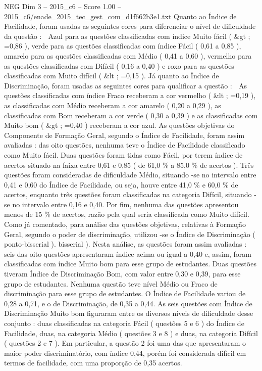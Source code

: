 \begin{textsample}{NEG Dim 3 – 2015\_c6 – Score 1.00 – 2015\_c6/enade\_2015\_tec\_gest\_com\_d1f662b3e1.txt}
Quanto ao Índice de Facilidade, foram usadas as seguintes cores para diferenciar o nível de dificuldade da questão :  Azul para as questões classificadas com índice Muito fácil ( \&gt ; =0,86 ), verde para as questões classificadas com índice Fácil ( 0,61 a 0,85 ), amarelo para as questões classificadas com Médio ( 0,41 a 0,60 ), vermelho para as questões classificadas com Difícil ( 0,16 a 0,40 ) e roxo para as questões classificadas com Muito difícil ( \&lt ; =0,15 ).
Já quanto ao Índice de Discriminação, foram usadas as seguintes cores para qualificar a questão :  As questões classificadas com índice Fraco receberam a cor vermelho ( \&lt ; =0,19 ), as classificadas com Médio receberam a cor amarelo ( 0,20 a 0,29 ), as classificadas com Bom receberam a cor verde ( 0,30 a 0,39 ) e as classificadas com Muito bom ( \&gt ; =0,40 ) receberam a cor azul.
As questões objetivas do Componente de Formação Geral, segundo o Índice de Facilidade, foram assim avaliadas : das oito questões, nenhuma teve o Índice de Facilidade classificado como Muito fácil.
Duas questões foram tidas como Fácil, por terem índice de acertos situado na faixa entre 0,61 e 0,85 ( de 61,0 \% a 85,0 \% de acertos ).
Três questões foram consideradas de dificuldade Médio, situando -se no intervalo entre 0,41 e 0,60 do Índice de Facilidade, ou seja, houve entre 41,0 \% e 60,0 \% de acertos, enquanto três questões foram classificadas na categoria Difícil, situando -se no intervalo entre 0,16 e 0,40.
Por fim, nenhuma das questões apresentou menos de 15 \% de acertos, razão pela qual seria classificada como Muito difícil.
Como já comentado, para análise das questões objetivas, relativas à Formação Geral, segundo o poder de discriminação, utilizou -se o Índice de Discriminação ( ponto-bisserial ). bisserial ).
Nesta análise, as questões foram assim avaliadas : seis das oito questões apresentaram índice acima ou igual a 0,40 e, assim, foram classificadas com índice Muito bom para esse grupo de estudantes.
Duas questões tiveram Índice de Discriminação Bom, com valor entre 0,30 e 0,39, para esse grupo de estudantes.
Nenhuma questão teve nível Médio ou Fraco de discriminação para esse grupo de estudantes.
O Índice de Facilidade variou de 0,28 a 0,71, e o de Discriminação, de 0,35 a 0,44.
As seis questões com Índice de Discriminação Muito bom figuraram entre os diversos níveis de dificuldade desse conjunto : duas classificadas na categoria Fácil ( questões 5 e 6 ) do Índice de Facilidade, duas, na categoria Médio ( questões 3 e 8 ) e duas, na categoria Difícil ( questões 2 e 7 ).
Em particular, a questão 2 foi uma das que apresentaram o maior poder discriminatório, com índice 0,44, porém foi considerada difícil em termos de facilidade, com uma proporção de 0,35 acertos.

\end{textsample}
